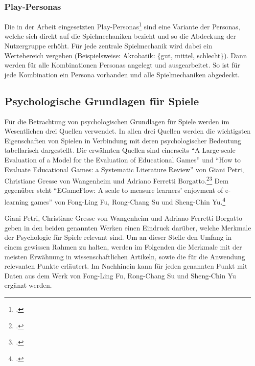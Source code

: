 	\subsubsection{Play-Personas}
		Die in der Arbeit eingesetzten Play-Personas\footcite{play-persona} sind eine Variante der Personas, welche sich direkt auf die Spielmechaniken bezieht und so die Abdeckung der Nutzergruppe erhöht. Für jede zentrale Spielmechanik wird dabei ein Wertebereich vergeben (Beispielsweise: Akrobatik: \{gut, mittel, schlecht\}). Dann werden für alle Kombinationen Personas angelegt und ausgearbeitet. So ist für jede Kombination ein Persona vorhanden und alle Spielmechaniken abgedeckt.

\subsection{Psychologische Grundlagen für Spiele}\label{ssec:psycho-grundlagen}
	Für die Betrachtung von psychologischen Grundlagen für Spiele werden im Wesentlichen drei Quellen verwendet. In allen drei Quellen werden die wichtigsten Eigenschaften von Spielen in Verbindung mit deren psychologischer Bedeutung tabellarisch dargestellt.
	Die erwähnten Quellen sind einerseits  \enquote{A Large-scale Evaluation of a Model for the Evaluation of Educational Games} und \enquote{How to Evaluate Educational Games: a Systematic Literature Review} von Giani Petri, Christiane Gresse von Wangenheim und Adriano Ferretti Borgatto.\footcite{psych1}\footcite{psych3} Dem gegenüber steht \enquote{EGameFlow: A scale to measure learners' enjoyment of e-learning games} von Fong-Ling Fu, Rong-Chang Su und Sheng-Chin Yu.\footcite{psych2}

	Giani Petri, Christiane Gresse von Wangenheim und Adriano Ferretti Borgatto geben in den beiden genannten Werken einen Eindruck darüber, welche Merkmale der Psychologie für Spiele relevant sind. Um an dieser Stelle den Umfang in einem gewissen Rahmen zu halten, werden im Folgenden die Merkmale mit der meisten Erwähnung in wissenschaftlichen Artikeln, sowie die für die Anwendung relevanten Punkte erläutert. Im Nachhinein kann für jeden genannten Punkt mit Daten aus dem Werk von Fong-Ling Fu, Rong-Chang Su und Sheng-Chin Yu ergänzt werden.

